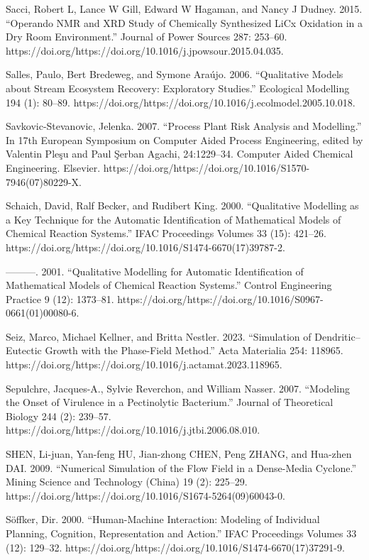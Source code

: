 \documentclass[utf8]{gradu3}
\begin{document}
Sacci, Robert L, Lance W Gill, Edward W Hagaman, and Nancy J Dudney. 2015. “Operando NMR and XRD Study of Chemically Synthesized LiCx Oxidation in a Dry Room Environment.” Journal of Power Sources 287: 253–60. https://doi.org/https://doi.org/10.1016/j.jpowsour.2015.04.035.

Salles, Paulo, Bert Bredeweg, and Symone Araújo. 2006. “Qualitative Models about Stream Ecosystem Recovery: Exploratory Studies.” Ecological Modelling 194 (1): 80–89. https://doi.org/https://doi.org/10.1016/j.ecolmodel.2005.10.018.

Savkovic-Stevanovic, Jelenka. 2007. “Process Plant Risk Analysis and Modelling.” In 17th European Symposium on Computer Aided Process Engineering, edited by Valentin Pleşu and Paul Şerban Agachi, 24:1229–34. Computer Aided Chemical Engineering. Elsevier. https://doi.org/https://doi.org/10.1016/S1570-7946(07)80229-X.

Schaich, David, Ralf Becker, and Rudibert King. 2000. “Qualitative Modelling as a Key Technique for the Automatic Identification of Mathematical Models of Chemical Reaction Systems.” IFAC Proceedings Volumes 33 (15): 421–26. https://doi.org/https://doi.org/10.1016/S1474-6670(17)39787-2.

———. 2001. “Qualitative Modelling for Automatic Identification of Mathematical Models of Chemical Reaction Systems.” Control Engineering Practice 9 (12): 1373–81. https://doi.org/https://doi.org/10.1016/S0967-0661(01)00080-6.

Seiz, Marco, Michael Kellner, and Britta Nestler. 2023. “Simulation of Dendritic–Eutectic Growth with the Phase-Field Method.” Acta Materialia 254: 118965. https://doi.org/https://doi.org/10.1016/j.actamat.2023.118965.

Sepulchre, Jacques-A., Sylvie Reverchon, and William Nasser. 2007. “Modeling the Onset of Virulence in a Pectinolytic Bacterium.” Journal of Theoretical Biology 244 (2): 239–57. https://doi.org/https://doi.org/10.1016/j.jtbi.2006.08.010.

SHEN, Li-juan, Yan-feng HU, Jian-zhong CHEN, Peng ZHANG, and Hua-zhen DAI. 2009. “Numerical Simulation of the Flow Field in a Dense-Media Cyclone.” Mining Science and Technology (China) 19 (2): 225–29. https://doi.org/https://doi.org/10.1016/S1674-5264(09)60043-0.

Söffker, Dir. 2000. “Human-Machine Interaction: Modeling of Individual Planning, Cognition, Representation and Action.” IFAC Proceedings Volumes 33 (12): 129–32. https://doi.org/https://doi.org/10.1016/S1474-6670(17)37291-9.
\end{document}
